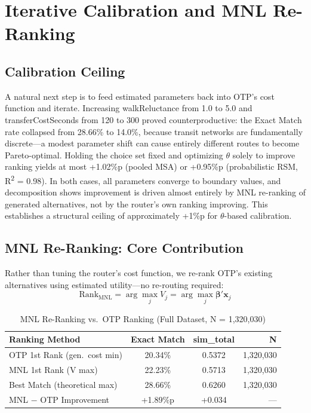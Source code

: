 \section{Iterative Calibration and MNL Re-Ranking}

\subsection{Calibration Ceiling}

A natural next step is to feed estimated parameters back into OTP's cost
function and iterate. Increasing walkReluctance from 1.0 to 5.0 and
transferCostSeconds from 120 to 300 proved counterproductive: the Exact Match
rate collapsed from 28.66\% to 14.0\%, because transit networks are
fundamentally discrete---a modest parameter shift can cause entirely different
routes to become Pareto-optimal. Holding the choice set fixed and optimizing
$\theta$ solely to improve ranking yields at most +1.02\%p (pooled MSA) or
+0.95\%p (probabilistic RSM, R\textsuperscript{2} = 0.98). In both cases, all
parameters converge to boundary values, and decomposition shows improvement is
driven almost entirely by MNL re-ranking of generated alternatives, not by the
router's own ranking improving. This establishes a structural ceiling of
approximately +1\%p for $\theta$-based calibration.

\subsection{MNL Re-Ranking: Core Contribution}

Rather than tuning the router's cost function, we re-rank OTP's existing
alternatives using estimated utility---no re-routing required:
\[
\mathrm{Rank}_{\mathrm{MNL}} = \arg\max_j V_j = \arg\max_j \boldsymbol{\beta}'\mathbf{x}_j
\]

\begin{table}[htbp]
\centering
\tablefont
\begin{tabular}{|l|c|c|r|}
\hline
\headrow
\textbf{Ranking Method} & \textbf{Exact Match} & \textbf{sim\_total} & \textbf{N} \\
\hline
OTP 1st Rank (gen.\ cost min)  & 20.34\%  & 0.5372 & 1,320,030 \\
\hline
MNL 1st Rank (V max)           & 22.23\%  & 0.5713 & 1,320,030 \\
\hline
Best Match (theoretical max)   & 28.66\%  & 0.6260 & 1,320,030 \\
\hline
MNL $-$ OTP Improvement        & +1.89\%p & +0.034 & ---       \\
\hline
\end{tabular}
\caption{MNL Re-Ranking vs.\ OTP Ranking (Full Dataset, N = 1,320,030)}
\end{table}

